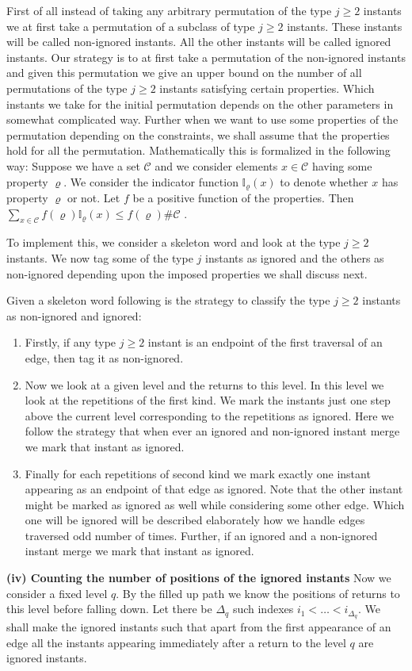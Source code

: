 \documentclass[12pt]{article}
\numberwithin{equation}{section}
\numberwithin{equation}{section}
\theoremstyle{definition}
\renewcommand{\1}{\bf 1}
\begin{document}
\noindent
First of all instead of taking any arbitrary permutation of the type $j\ge 2$ instants we at first take a permutation of a subclass of type $j \ge 2$ instants. These instants will be called non-ignored instants. All the other instants will be called ignored instants. Our strategy is to at first take a permutation of the non-ignored instants and given this permutation we give an upper bound on the number of all permutations of the type $j \ge 2$ instants satisfying certain properties.  Which instants we take for the initial permutation depends on the other parameters in somewhat complicated way. Further when we want to use some properties of the permutation depending on the constraints, we shall assume that the properties hold for all the permutation. Mathematically this is formalized in the following way: Suppose we have a set $\mathcal{C}$ and we consider elements $x\in \mathcal{C}$ having some property $\varrho$. We consider the indicator function $\mathbb{I}_{\varrho}(x)$ to denote whether $x$ has property $\varrho$ or not. Let $f$ be a positive function of the properties. Then $\sum_{x \in \mathcal{C}} f(\varrho)\mathbb{I}_{\varrho}(x) \le f(\varrho) \# \mathcal{C}$ . 

\noindent
To implement this, we consider a skeleton word and look at the type $j \ge 2$ instants. We now tag some of the type $j$ instants as ignored and the others as non-ignored depending upon the imposed properties we shall discuss next.

\noindent
Given a skeleton word following is the strategy to classify the type $j\ge 2$ instants as non-ignored and ignored:
\begin{enumerate}
\item Firstly, if any type $j \ge 2$ instant is an endpoint of the first traversal of an edge, then tag it as non-ignored.
\item Now we look at a given level and the returns to this level. In this level we look at the repetitions of the first kind. We mark the instants just one step above the current level corresponding to the repetitions as ignored. Here we follow the strategy that when ever an ignored and non-ignored instant merge we mark that instant as ignored.
\item Finally for each repetitions of second kind we mark exactly one instant appearing as an endpoint of that edge as ignored. Note that the other instant might be marked as ignored as well while considering some other edge. Which one will be ignored will be described elaborately how we handle edges traversed odd number of times. Further, if an ignored and a non-ignored instant merge we mark that instant as ignored.  
\end{enumerate}
\textbf{(iv) Counting the number of positions of the ignored instants}
Now we consider a fixed level $q$. By the filled up path we know the positions of returns to this level before falling down. Let there be $\Delta_{q}$ such indexes $ i_{1}< \ldots < i_{\Delta_{q}}$. We shall make the ignored instants such that apart from the first appearance of an edge all the instants appearing immediately after a return to the level $q$ are ignored instants.   
\end{document}
